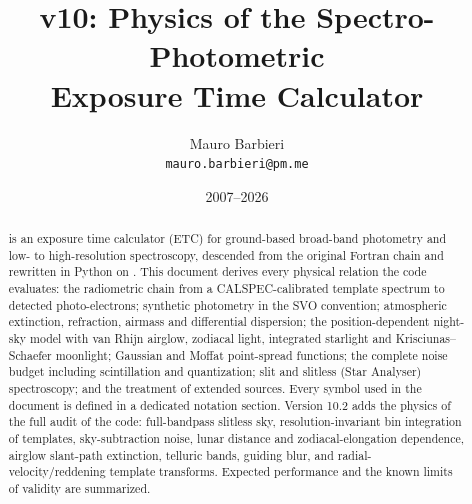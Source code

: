 \documentclass[11pt, a4paper]{article}
\title{\spetc{} v10: Physics of the Spectro-Photometric\\Exposure Time Calculator}
\author{Mauro Barbieri\\\small\texttt{mauro.barbieri@pm.me}}
\date{2007--2026}
\begin{document}
\maketitle

\begin{abstract}
\spetc{} is an exposure time calculator (ETC) for ground-based broad-band
photometry and low- to high-resolution spectroscopy, descended from the
original Fortran  chain and rewritten in Python on
. This document derives every physical relation the code
evaluates: the radiometric chain from a CALSPEC-calibrated template spectrum
to detected photo-electrons; synthetic photometry in the SVO convention;
atmospheric extinction, refraction, airmass and differential dispersion; the
position-dependent night-sky model with van Rhijn airglow, zodiacal light,
integrated starlight and Krisciunas--Schaefer moonlight; Gaussian and Moffat
point-spread functions; the complete noise budget including scintillation and
quantization; slit and slitless (Star Analyser) spectroscopy; and the
treatment of extended sources. Every symbol used in the document is defined
in a dedicated notation section. Version 10.2 adds the physics of the full
audit of the code: full-bandpass slitless sky, resolution-invariant bin
integration of templates, sky-subtraction noise, lunar distance and
zodiacal-elongation dependence, airglow slant-path extinction, telluric
bands, guiding blur, and radial-velocity/reddening template transforms.
Expected performance and the known limits of validity are summarized.
\end{abstract}

\tableofcontents















\end{document}
